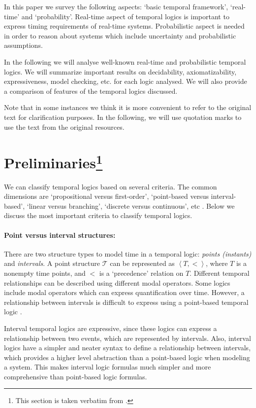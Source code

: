 \documentclass[11pt]{article}
\begin{document}
In this paper we survey the following aspects: `basic temporal framework', `real-time' and `probability'. Real-time aspect of temporal logics is important to express timing requirements of real-time systems. Probabilistic aspect is needed in order to reason about systems which include uncertainty and probabilistic assumptions. 

In the following we will analyse well-known real-time and probabilistic temporal logics. We will summarize important results on decidability, axiomatizability, expressiveness, model checking, etc. for each logic analysed. We will also provide a comparison of features of the temporal logics discussed.  

Note that in some instances we think it is more convenient to refer to the original text for clarification purposes. In the following,  we will use quotation marks to use the text from the original resources. 


\section[Pre]{Preliminaries\footnote{This section is taken verbatim from \cite{Kon10}.}} \label{sec:Classification-of-Temporal}

We can classify temporal logics based on several criteria. The common dimensions are `propositional versus first-order', `point-based versus interval-based', `linear versus branching', `discrete versus continuous', etc \cite{Eme95,Ven98,BMN00}. Below we discuss the most important  criteria to classify temporal logics.

\paragraph{Point versus interval structures:} There are two structure types to model time in a  temporal logic: \emph{points (instants)} and \emph{intervals}. A point structure $\mathcal{T}$  can be represented as $\left\langle T,<\right\rangle$, where $T$ is a nonempty time points, and $<$ is a `precedence' relation on $T$. Different temporal relationships can be described using different modal operators. Some logics include modal operators  which can express quantification over time. However, a relationship between intervals is difficult to express using a point-based temporal logic \cite{FM94}. 

Interval temporal logics are expressive, since these logics can express a relationship between two events, which are represented by intervals. Also, interval logics \cite{SMS82,SMV83,Mos83,Lad87,MS87,RG89,HS91} have a simpler and neater syntax to define a relationship between intervals, which provides a higher level abstraction than a point-based logic when modeling a system. This makes interval logic formulas much simpler and more comprehensive than point-based logic formulas. 
\end{document}
